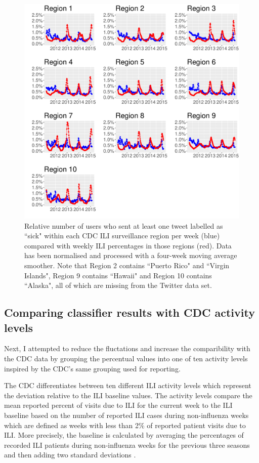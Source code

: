 \documentclass[11pt, a4paper,twoside]{report}\usepackage[]{graphicx}\usepackage[]{color}
\begin{document}
\begin{figure}[H]
\centering
\includegraphics[width=1\linewidth]{cdc_twitter_comp_regs_ma4_user.pdf}
\caption{Relative number of users who sent at least one tweet labelled as ``sick" within each CDC ILI surveillance region per week (blue) compared with weekly ILI percentages in those regions (red). Data has been normalised and processed with a four-week moving average smoother. Note that Region 2 contains ``Puerto Rico" and ``Virgin Islands", Region 9 contains ``Hawaii" and Region 10 contains ``Alaska", all of which are missing from the Twitter data set.}
\label{fig:cdc_tw_comp_regs_ma4}
\end{figure}

\subsection{Comparing classifier results with CDC activity levels}
\label{sec:comp_cdc_ac}
Next, I attempted to reduce the fluctations and increase the comparibility with the CDC data by grouping the percentual values into one of ten activity levels inspired by the CDC's same grouping used for reporting.

The CDC differentiates between ten different ILI activity levels which represent the deviation relative to the ILI baseline values. The activity levels compare the mean reported percent of visits due to ILI for the current week to the ILI baseline based on the number of reported ILI cases during non-influenza weeks which are defined as weeks with less than 2\% of reported patient visits due to ILI. More precisely, the baseline is calculated by averaging the percentages of recorded ILI patients during non-influenza weeks for the previous three seasons and then adding two standard deviations \citep{cdc_surveillance_2016}.
\end{document}
